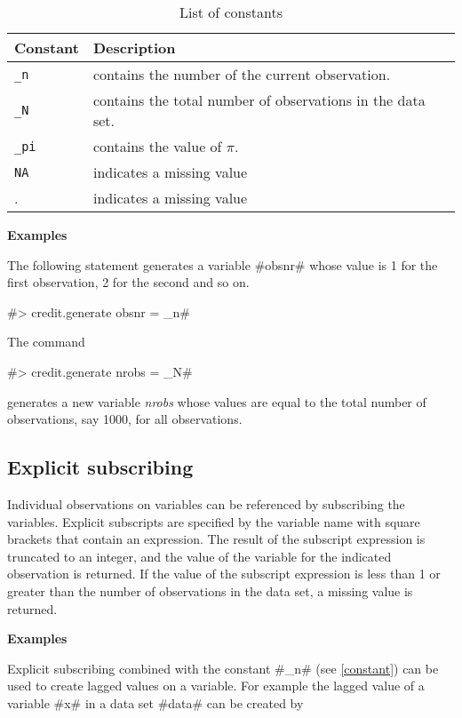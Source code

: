 \begin{table}[ht]
\begin{center}
\begin{tabular}{|l|l|}
\hline
Constant & Description \\
\hline \hline
\texttt{\_n} & contains the number of the current observation.  \\
\texttt{\_N }& contains the total number of observations in the data set. \\
\texttt{\_pi} & contains the value of $\pi$. \\
\texttt{NA} & indicates a missing value \\
.  & indicates a missing value \\

\hline
\end{tabular}
{\em \caption{\label{constant} List of constants}}
\end{center}
\end{table}


{\bf Examples}

The following statement generates a variable #obsnr# whose value
is 1 for the first observation, 2 for the second and so on.

#> credit.generate obsnr = _n#

The command

#> credit.generate nrobs = _N#

generates a new variable {\em nrobs} whose values are equal to the
total number of observations, say 1000, for all observations.

\subsection{Explicit subscribing}
 

Individual observations on variables can be referenced by
subscribing the variables. Explicit subscripts are specified by
the variable name with square brackets that contain an expression.
The result of the subscript expression is truncated to an integer,
and the value of the variable for the indicated observation is
returned. If  the value of the subscript expression is less than 1
or greater than the number of observations in the data set,
a missing value is returned.

{\bf Examples}

Explicit subscribing combined with the constant #_n# (see
\autoref{constant}) can be used to create lagged values
on a variable. For example the lagged value of a variable #x# in a data set #data# can be created by

